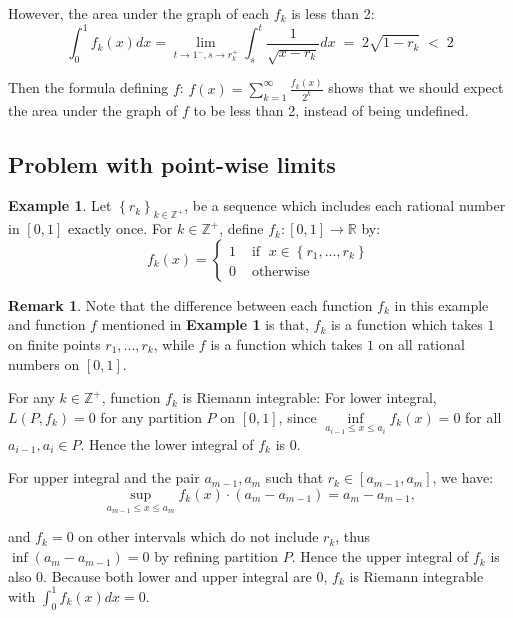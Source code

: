 \documentclass[reqno]{amsart}
\theoremstyle{definition}
\newtheorem{remark}{Remark}{\normalfont}
\newtheorem{example}{Example}
\begin{document}
However, the area under the graph of each $f_{k}$ is less than 2:
$$
\int^{1}_{0} f_{k}(x) dx =\lim\limits_{\scriptscriptstyle t \rightarrow 1^{-}, s \rightarrow r^{+}_{k}}\int^{t}_{s} \frac{1}{\sqrt{x-r_{k}}} dx \;=\; 2\sqrt{1-r_{k}} \;< \; 2
$$

Then the formula defining $f$: $f(x) = \sum\limits^{\infty}_{k=1}\frac{f_{k}(x)}{2^{k}}$ shows that we should expect the area under the graph of $f$ to be less than 2, instead of being undefined. 

\subsection{Problem with point-wise limits}
\begin{example}
Let $\left\{r_{k}\right\}_{k \in \mathbb{Z}^{+}}$, be a sequence which includes each rational number in $[0, 1]$ exactly once. For $k \in \mathbb{Z}^{+}$, define $f_{k}: [0, 1] \rightarrow \mathbb{R}$ by:
$$
f_{k}(x) = 
\begin{cases}
1 &  \mbox{ if } \; x \in \left\{r_{1},..., r_{k}\right\}\\
0 &  \mbox{ otherwise}
\end{cases}
$$
\end{example}

\begin{remark}
Note that the difference between each function $f_{k}$ in this example and function $f$ mentioned in \textbf{Example 1} is that, $f_{k}$ is a function which takes $1$ on finite points $r_{1},...,r_{k}$, while $f$ is a function which takes $1$ on all rational numbers on $[0, 1]$.
\end{remark}

For any $k \in \mathbb{Z}^{+}$, function $f_{k}$ is Riemann integrable: For lower integral, $L(P, f_{k}) = 0$ for any partition $P$ on $[0, 1]$, since $\inf\limits_{\scriptscriptstyle a_{i-1} \leq x \leq a_{i}}f_{k}(x) = 0$ for all $a_{i-1}, a_{i} \in P$. Hence the lower integral of $f_{k}$ is $0$. 

For upper integral and the pair $a_{m-1}, a_{m}$ such that $r_{k} \in [a_{m-1}, a_{m}]$, we have:
$$
\sup\limits_{\scriptscriptstyle a_{m-1} \leq x \leq a_{m}}f_{k}(x)\cdot(a_{m}-a_{m-1}) = a_{m}-a_{m-1},
$$

and $f_{k} = 0$ on other intervals which do not include $r_{k}$, thus $\inf(a_{m}-a_{m-1}) = 0$ by refining partition $P$. Hence the upper integral of $f_{k}$ is also $0$. Because both lower and upper integral are 0, $f_{k}$ is Riemann integrable with $\int^{1}_{0}f_{k}(x) dx = 0$.
\end{document}
